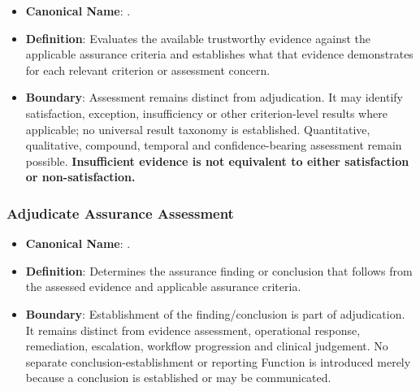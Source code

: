\begin{itemize}

\item
\textbf{Canonical Name}: \texttt{}.



\item
\textbf{Definition}: Evaluates the available trustworthy evidence against the applicable assurance criteria and establishes what that evidence demonstrates for each relevant criterion or assessment concern.



\item
\textbf{Boundary}: Assessment remains distinct from adjudication. It may identify satisfaction, exception, insufficiency or other criterion-level results where applicable; no universal result taxonomy is established. Quantitative, qualitative, compound, temporal and confidence-bearing assessment remain possible. \textbf{Insufficient evidence is not equivalent to either satisfaction or non-satisfaction.}



\end{itemize}
\label{rad:assurance:114}



\label{rad:assurance:116}
\subsubsection*{Adjudicate Assurance Assessment}
\label{rad:assurance:118}

\begin{itemize}

\item
\textbf{Canonical Name}: \texttt{}.



\item
\textbf{Definition}: Determines the assurance finding or conclusion that follows from the assessed evidence and applicable assurance criteria.



\item
\textbf{Boundary}: Establishment of the finding/\allowbreak{}conclusion is part of adjudication. It remains distinct from evidence assessment, operational response, remediation, escalation, workflow progression and clinical judgement. No separate conclusion-establishment or reporting Function is introduced merely because a conclusion is established or may be communicated.



\end{itemize}
\label{rad:assurance:122}
